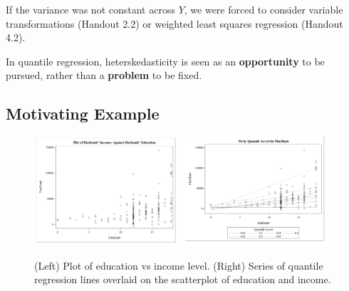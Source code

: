 \documentclass[12pt]{notes}
\begin{document}
\nspace
If the variance was not constant across $Y$, we were forced to consider variable transformations (Handout 2.2) or weighted least squares regression (Handout 4.2). 

\nspace
In quantile regression, heterskedasticity is seen as an \textbf{opportunity} to be pursued, rather than a \textbf{problem} to be fixed. 

\subsection{Motivating Example}

\begin{figure}[H]
\includegraphics[width=0.48\textwidth]{figures/module7/education_scatter.png}
\includegraphics[width=0.48\textwidth]{figures/module7/education_scatter_2.png}
\caption{(Left) Plot of education vs income level. (Right) Series of quantile regression lines overlaid on the scatterplot of education and income.}
\label{fig:edscatter}
\end{figure}

\begin{minipage}[l][2cm][c]{\textwidth}

\end{minipage}
\end{document}
